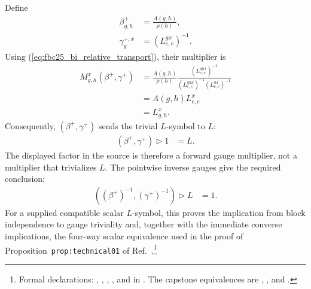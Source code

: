 \documentclass{article}
\begin{document}
Define
\begin{align}
    \beta^+_{g,h}
        &=\frac{A(g,h)}{\rho(h)},
    \label{eq:fbc25_bi_forward_fusion_gauge}\\
    \gamma^{+,x}_g
        &=(L^{g x}_{e,e})^{-1}.
    \label{eq:fbc25_bi_forward_action_gauge}
\end{align}
Using (\ref{eq:fbc25_bi_relative_transport}), their multiplier is
\begin{align}
    M^x_{g,h}(\beta^+,\gamma^+)
        &=\frac{A(g,h)}{\rho(h)}
          \frac{(L^{ghx}_{e,e})^{-1}}
          {(L^{ghx}_{e,e})^{-1}(L^{hx}_{e,e})^{-1}}
    \label{eq:fbc25_bi_forward_multiplier_first}\\
        &=A(g,h)L^x_{e,e}
    \label{eq:fbc25_bi_forward_multiplier_second}\\
        &=L^x_{g,h}.
    \label{eq:fbc25_bi_forward_multiplier_lsymbol}
\end{align}
Consequently, $(\beta^+,\gamma^+)$ sends the trivial $L$-symbol to $L$:
\begin{align}
    (\beta^+,\gamma^+)\mathbin{\triangleright}1
        &=L.
    \label{eq:fbc25_bi_forward_gauge_produces_lsymbol}
\end{align}
The displayed factor in the source is therefore a forward gauge multiplier,
not a multiplier that trivializes $L$. The pointwise inverse gauges give the
required conclusion:
\begin{align}
    ((\beta^+)^{-1},(\gamma^+)^{-1})
        \mathbin{\triangleright}L
        &=1.
    \label{eq:fbc25_bi_inverse_gauge_trivializes_lsymbol}
\end{align}
For a supplied compatible scalar $L$-symbol, this proves the implication from
block independence to gauge triviality and, together with the immediate
converse implications, the four-way scalar equivalence used in the proof of
Proposition~\texttt{prop:technical01} of
Ref.~\cite{FrancoRubio2025MPUGauging}.\footnote{Formal declarations:
,
,
,
, and
 in
. The capstone equivalences
are ,
, and
.}
\end{document}
